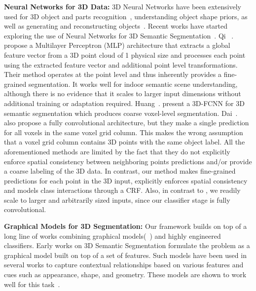 \documentclass[10pt,twocolumn,letterpaper]{article}
\newcommand{\fccrf}[0]{CRF\xspace}
\newcommand{\threedfcnn}[0]{3D-FCNN\xspace}
\begin{document}
\textbf{Neural Networks for 3D Data:} 3D Neural Networks have been extensively used for 3D object and parts recognition~\cite{DeepSlidingShapes, qi2016volumetric, maturana_iros_2015, Guo2015, DBLP:journals/corr/QiSMG16, Garcia}, understanding object shape priors, as well as generating and reconstructing objects~\cite{Yan2016, 3dgan, fan2016, 3dinterpreter, choy20163d}. Recent works have started exploring the use of Neural Networks for 3D Semantic Segmentation~\cite{DBLP:journals/corr/QiSMG16, dai2017scannet, J.Huang2016}. Qi ~\etal.~\cite{DBLP:journals/corr/QiSMG16} propose a Multilayer Perceptron (MLP) architecture that extracts a global feature vector from a 3D point cloud of 1 physical size and processes each point using the extracted feature vector and additional point level transformations. Their method operates at the point level and thus inherently provides a fine-grained segmentation. It works well for indoor semantic scene understanding, although there is no evidence that it scales to larger input dimensions without additional training or adaptation required. Huang~\etal. \cite{J.Huang2016} present a \threedfcnn for 3D semantic segmentation which produces coarse voxel-level segmentation. Dai~\etal.~\cite{dai2017scannet} also propose a fully convolutional architecture, but they make a single prediction for all voxels in the same voxel grid column. This makes the wrong assumption that a voxel grid column contains 3D points with the same object label. All the aforementioned methods are limited by the fact that they do not explicitly enforce spatial consistency between neighboring points predictions and/or provide a coarse labeling of the 3D data. In contrast, our method makes fine-grained predictions for each point in the 3D input, explicitly enforces spatial consistency and models class interactions through a \fccrf. Also, in contrast to \cite{DBLP:journals/corr/QiSMG16}, we readily scale to larger and arbitrarily sized inputs, since our classifier stage is fully convolutional.

\textbf{Graphical Models for 3D Segmentation:} Our framework builds on top of a long line of works combining graphical models(~\cite{Taskar2004, Taskar2003,Lafferty2001CRF,Felzenszwalb2004,Ladicky2014}) and highly engineered classifiers. Early works on 3D Semantic Segmentation formulate the problem as a graphical model built on top of a set of features. Such models have been used in several works to capture contextual relationships based on various features and cues such as appearance, shape, and geometry. These models are shown to work well for this task~\cite{Munoz2009,Munoz2008, Koppula2011, Shapovalov2010, Lu2012,Anand2013,munoz-eccv-12}.
\end{document}
